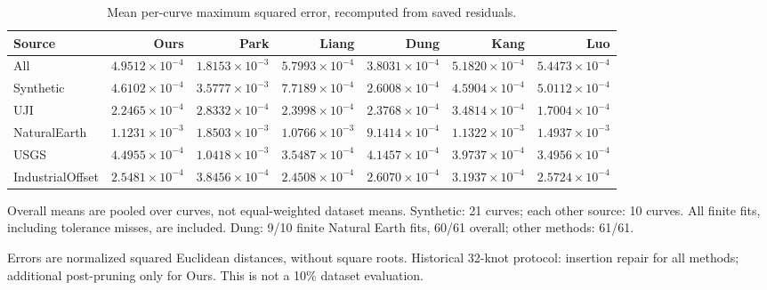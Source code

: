\documentclass{article}
\begin{document}
\begin{table}[htbp]\centering\small
\caption{Mean per-curve maximum squared error, recomputed from saved residuals.}
\begin{tabular}{lrrrrrr}\toprule
Source & Ours & Park & Liang & Dung & Kang & Luo \\\midrule
All & $4.9512\times10^{-4}$ & $1.8153\times10^{-3}$ & $5.7993\times10^{-4}$ & $3.8031\times10^{-4}$ & $5.1820\times10^{-4}$ & $5.4473\times10^{-4}$ \\
Synthetic & $4.6102\times10^{-4}$ & $3.5777\times10^{-3}$ & $7.7189\times10^{-4}$ & $2.6008\times10^{-4}$ & $4.5904\times10^{-4}$ & $5.0112\times10^{-4}$ \\
UJI & $2.2465\times10^{-4}$ & $2.8332\times10^{-4}$ & $2.3998\times10^{-4}$ & $2.3768\times10^{-4}$ & $3.4814\times10^{-4}$ & $1.7004\times10^{-4}$ \\
NaturalEarth & $1.1231\times10^{-3}$ & $1.8503\times10^{-3}$ & $1.0766\times10^{-3}$ & $9.1414\times10^{-4}$ & $1.1322\times10^{-3}$ & $1.4937\times10^{-3}$ \\
USGS & $4.4955\times10^{-4}$ & $1.0418\times10^{-3}$ & $3.5487\times10^{-4}$ & $4.1457\times10^{-4}$ & $3.9737\times10^{-4}$ & $3.4956\times10^{-4}$ \\
IndustrialOffset & $2.5481\times10^{-4}$ & $3.8456\times10^{-4}$ & $2.4508\times10^{-4}$ & $2.6070\times10^{-4}$ & $3.1937\times10^{-4}$ & $2.5724\times10^{-4}$ \\
\bottomrule\end{tabular}
\end{table}
\noindent Overall means are pooled over curves, not equal-weighted dataset means. Synthetic: 21 curves; each other source: 10 curves. All finite fits, including tolerance misses, are included. Dung: 9/10 finite Natural Earth fits, 60/61 overall; other methods: 61/61.
\par Errors are normalized squared Euclidean distances, without square roots. Historical 32-knot protocol: insertion repair for all methods; additional post-pruning only for Ours. This is not a 10\% dataset evaluation.
\end{document}
